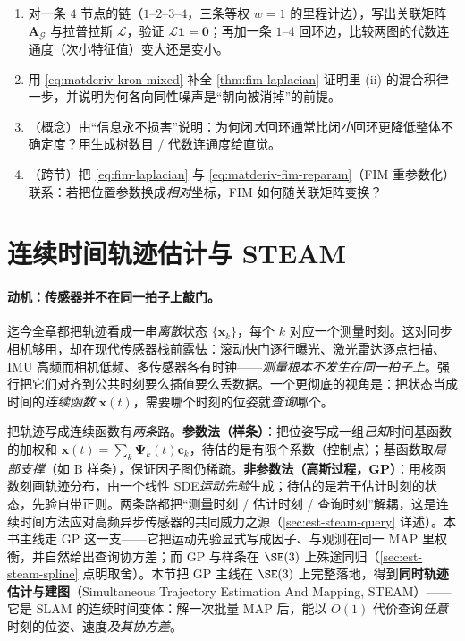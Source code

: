 \begin{practice}
\begin{enumerate}
  \item 对一条 $4$ 节点的链（$1$–$2$–$3$–$4$，三条等权 $w=1$ 的里程计边），写出关联矩阵 $\mathbf{A}_{\mathcal{G}}$ 与拉普拉斯 $\boldsymbol{\mathcal{L}}$，验证 $\boldsymbol{\mathcal{L}}\mathbf{1}=\mathbf{0}$；再加一条 $1$–$4$ 回环边，比较两图的代数连通度（次小特征值）变大还是变小。
  \item 用 \cref{eq:matderiv-kron-mixed} 补全 \cref{thm:fim-laplacian} 证明里 (ii) 的混合积律一步，并说明为何各向同性噪声是“朝向被消掉”的前提。
  \item （概念）由“信息永不损害”说明：为何闭\emph{大}回环通常比闭\emph{小}回环更降低整体不确定度？用生成树数目 / 代数连通度给直觉。
  \item （跨节）把 \cref{eq:fim-laplacian} 与 \cref{eq:matderiv-fim-reparam}（FIM 重参数化）联系：若把位置参数换成\emph{相对}坐标，FIM 如何随关联矩阵变换？
\end{enumerate}
\end{practice}

\section{连续时间轨迹估计与 STEAM}
\label{sec:est-steam}

\paragraph{动机：传感器并不在同一拍子上敲门。}
迄今全章都把轨迹看成一串\emph{离散}状态 $\{\mathbf{x}_k\}$，每个 $k$ 对应一个测量时刻。这对同步相机够用，却在现代传感器栈前露怯：滚动快门逐行曝光、激光雷达逐点扫描、IMU 高频而相机低频、多传感器各有时钟——\emph{测量根本不发生在同一拍子上}。强行把它们对齐到公共时刻要么插值要么丢数据。一个更彻底的视角是：把状态当成时间的\emph{连续函数} $\mathbf{x}(t)$，需要哪个时刻的位姿就\emph{查询}哪个。

把轨迹写成连续函数有\emph{两条}路\cite{carlone2026handbook}。\textbf{参数法（样条）}：把位姿写成一组\emph{已知}时间基函数的加权和 $\mathbf{x}(t)=\sum_k\boldsymbol{\Psi}_k(t)\mathbf{c}_k$，待估的是有限个系数（控制点）；基函数取\emph{局部支撑}（如 B 样条），保证因子图仍稀疏。\textbf{非参数法（高斯过程，GP）}：用核函数刻画轨迹分布，由一个线性 SDE\emph{运动先验}生成；待估的是若干估计时刻的状态，先验自带正则。两条路都把“测量时刻 / 估计时刻 / 查询时刻”解耦，这是连续时间方法应对高频异步传感器的共同威力之源（\cref{sec:est-steam-query} 详述）。本书主线走 GP 这一支——它把运动先验显式写成因子、与观测在同一 MAP 里权衡，并自然给出查询协方差；而 GP 与样条在 $\SE(3)$ 上殊途同归（\cref{sec:est-steam-spline} 点明取舍）。本节把 GP 主线在 $\SE(3)$ 上完整落地，得到\textbf{同时轨迹估计与建图}（Simultaneous Trajectory Estimation And Mapping, STEAM）\cite{anderson2015steam}——它是 SLAM 的连续时间变体：解一次批量 MAP 后，能以 $O(1)$ 代价查询\emph{任意}时刻的位姿、速度\emph{及其协方差}。


